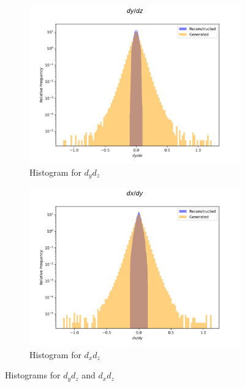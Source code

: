 \documentclass{article}
\begin{document}
\begin{figure}[H]
    \centering
    \begin{subfigure}[b]{0.45\textwidth}
        \includegraphics[width=\textwidth]{graphs/hadr_dy_dz.png}
        \caption{Histogram for $d_yd_z$}
        \label{fig:had_Angle_m}
    \end{subfigure}
    \hfill
    \begin{subfigure}[b]{0.45\textwidth}
        \includegraphics[width=\textwidth]{graphs/hadr_dx_dy.png}
        \caption{Histogram for $d_xd_z$}
        \label{fig:had_Angle}
    \end{subfigure}
    \caption{Histograms for $d_yd_z$ and $d_xd_z$}
\end{figure}
\end{document}
